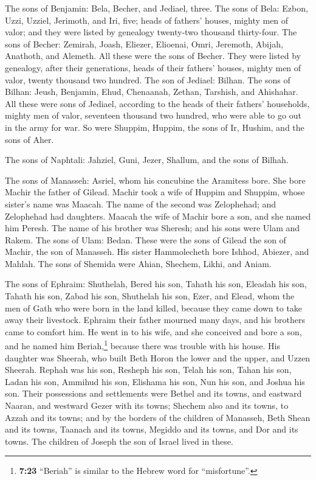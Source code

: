  The sons of Benjamin: Bela, Becher, and Jediael, three.
 The sons of Bela: Ezbon, Uzzi, Uzziel, Jerimoth, and Iri,
five; heads of fathers' houses, mighty men of valor; and they were
listed by genealogy twenty-two thousand thirty-four.  The
sons of Becher: Zemirah, Joash, Eliezer, Elioenai, Omri, Jeremoth,
Abijah, Anathoth, and Alemeth. All these were the sons of Becher.
 They were listed by genealogy, after their generations,
heads of their fathers' houses, mighty men of valor, twenty thousand two
hundred.  The son of Jediael: Bilhan. The sons of Bilhan:
Jeush, Benjamin, Ehud, Chenaanah, Zethan, Tarshish, and Ahishahar.
 All these were sons of Jediael, according to the heads
of their fathers' households, mighty men of valor, seventeen thousand
two hundred, who were able to go out in the army for war.
 So were Shuppim, Huppim, the sons of Ir, Hushim, and the
sons of Aher.

 The sons of Naphtali: Jahziel, Guni, Jezer, Shallum, and
the sons of Bilhah.

 The sons of Manasseh: Asriel, whom his concubine the
Aramitess bore. She bore Machir the father of Gilead. 
Machir took a wife of Huppim and Shuppim, whose sister's name was
Maacah. The name of the second was Zelophehad; and Zelophehad had
daughters.  Maacah the wife of Machir bore a son, and she
named him Peresh. The name of his brother was Sheresh; and his sons were
Ulam and Rakem.  The sons of Ulam: Bedan. These were the
sons of Gilead the son of Machir, the son of Manasseh. 
His sister Hammolecheth bore Ishhod, Abiezer, and Mahlah.
 The sons of Shemida were Ahian, Shechem, Likhi, and
Aniam.

 The sons of Ephraim: Shuthelah, Bered his son, Tahath
his son, Eleadah his son, Tahath his son,  Zabad his son,
Shuthelah his son, Ezer, and Elead, whom the men of Gath who were born
in the land killed, because they came down to take away their livestock.
 Ephraim their father mourned many days, and his brothers
came to comfort him.  He went in to his wife, and she
conceived and bore a son, and he named him Beriah,\footnote{\textbf{7:23}
  ``Beriah'' is similar to the Hebrew word for ``misfortune''.} because
there was trouble with his house.  His daughter was
Sheerah, who built Beth Horon the lower and the upper, and Uzzen
Sheerah.  Rephah was his son, Resheph his son, Telah his
son, Tahan his son,  Ladan his son, Ammihud his son,
Elishama his son,  Nun his son, and Joshua his son.
 Their possessions and settlements were Bethel and its
towns, and eastward Naaran, and westward Gezer with its towns; Shechem
also and its towns, to Azzah and its towns;  and by the
borders of the children of Manasseh, Beth Shean and its towns, Taanach
and its towns, Megiddo and its towns, and Dor and its towns. The
children of Joseph the son of Israel lived in these.

